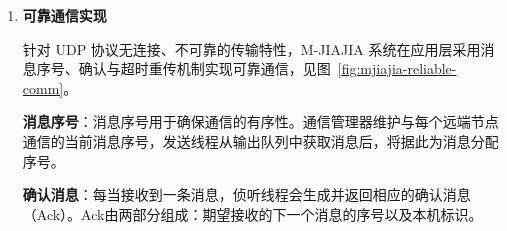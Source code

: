 {\begin{enumerate}[label=\arabic*.]
\begin{algorithm}[H]
\begin{algorithmic}[1]
                      \State
                      \State $ack \gets \{ msg.seqno+1, msg.topid \}$
                      \State initialize $ack\_addr \gets \{ ack\_port,hosts[msg.frompid].ip \}$
                      \State {}

                      \State
                      \State $rcv\_seq[to\_id]$++
                      \State {}
                      \EndIf
                      \EndFor
                      \EndWhile
                      \State \textbf{return}
                      \EndProcedure
                  \end{algorithmic}
              \end{algorithm}

              \textbf{服务线程}：服务线程负责从输入队列中提取消息，并根据消息类型进行相应的服务。伪代码如算法~\ref{alg:server-thread} 所示。
              \begin{algorithm}[H]
                  \caption{server thread algorithm}\label{alg:server-thread}
                  \begin{algorithmic}[1] %
                      \State {}

                      \State $msg\_ptr \gets$ 
                      \State {}

                      \State {}
                      \State \textbf{return}
                      \EndProcedure
                  \end{algorithmic}
              \end{algorithm}

        \item \textbf{可靠通信实现}

              针对 UDP 协议无连接、不可靠的传输特性，M-JIAJIA 系统在应用层采用消息序号、确认与超时重传机制实现可靠通信，见图~\ref{fig:mjiajia-reliable-comm}。

              \textbf{消息序号}：消息序号用于确保通信的有序性。通信管理器维护与每个远端节点通信的当前消息序号，发送线程从输出队列中获取消息后，将据此为消息分配序号。

              \textbf{确认消息}：每当接收到一条消息，侦听线程会生成并返回相应的确认消息（Ack）。Ack由两部分组成：期望接收的下一个消息的序号以及本机标识。


\end{enumerate}}
